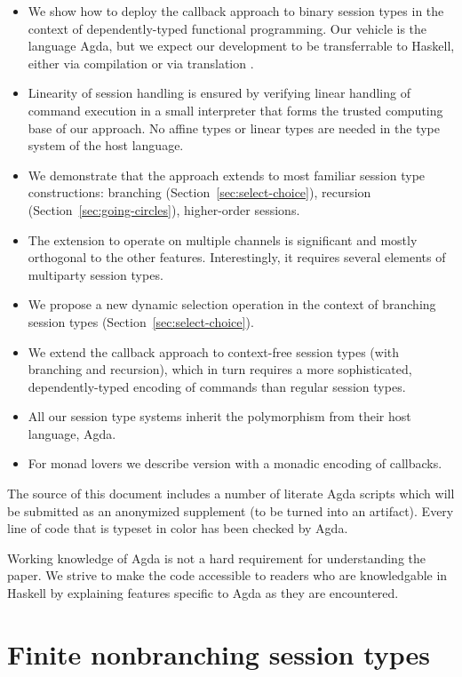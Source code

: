\documentclass[acmsmall,screen,anonymous,review]{acmart}
\begin{document}
\begin{itemize}
\item We show how to deploy the callback approach to binary session
  types in the context of dependently-typed functional
  programming. Our vehicle is the language Agda, but we expect our
  development to be transferrable to Haskell, either via compilation or via translation
  \cite{DBLP:conf/haskell/CockxME0N22}.
\item Linearity of session handling is ensured by verifying linear
  handling of command execution in a small interpreter that forms the
  trusted computing base of our approach. No affine
  types or linear types are needed in the type system of the host
  language.
\item We demonstrate that the approach extends to most familiar
  session type constructions: branching
  (Section~\ref{sec:select-choice}), recursion
  (Section~\ref{sec:going-circles}), higher-order sessions.
\item The extension to operate on multiple channels is significant and
  mostly orthogonal to the other features. Interestingly, it requires
  several elements of multiparty session types.
\item We propose a new dynamic selection operation in the context of
  branching session types (Section~\ref{sec:select-choice}).
\item We extend the callback approach to context-free session types
  (with branching and recursion), which in turn requires a more
  sophisticated, dependently-typed encoding of commands than regular
  session types.
\item All our session type systems inherit the polymorphism from their
  host language, Agda.
\item For monad lovers we describe version with a monadic encoding of callbacks.
\end{itemize}

The source of this document includes a number of literate Agda
scripts which will be submitted as an anonymized supplement (to be
turned into an artifact). Every line of code that is typeset in color
has been checked by Agda.


Working knowledge of Agda is not a hard requirement for understanding the
paper. We strive to make the code accessible to readers who are
knowledgable in Haskell by explaining features specific
to Agda as they are encountered.

\section{Finite nonbranching session types}
\label{sec:finite-nonbr-simple}
\end{document}
